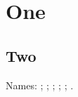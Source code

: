 \documentclass{article}
\newcounter{foo}[subsection]
\newcounter{bar}
\begin{document}
\section{One}
\subsection{Two}
Names: \theHsection; \theHsubsection; \theHfoo; \theHbar; \theHequation; \theHfigure.
\end{document}
